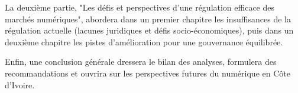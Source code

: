 La deuxième partie, "Les défis et perspectives d'une régulation efficace des marchés numériques", abordera dans un premier chapitre les insuffisances de la régulation actuelle (lacunes juridiques et défis socio-économiques), puis dans un deuxième chapitre les pistes d'amélioration pour une gouvernance équilibrée.

Enfin, une conclusion générale dressera le bilan des analyses, formulera des recommandations et ouvrira sur les perspectives futures du numérique en Côte d'Ivoire.